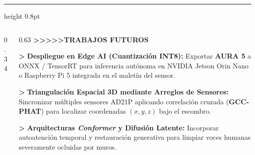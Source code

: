 \documentclass[aspectratio=169, 10pt]{beamer}
\begin{document}
\begin{frame}[plain]
    \vspace{0.25cm}
    {\color{immuneCyan!50}\hrule height 0.8pt}
    \vspace{0.18cm}

    \begin{columns}[T, onlytextwidth]
        \begin{column}{0.34\textwidth}
            \setlength{\fboxsep}{5pt}%
            \setlength{\fboxrule}{1.2pt}%
        \end{column}

        \begin{column}{0.63\textwidth}
            {\bfseries\fontsize{9.2}{10.8}\selectfont\color{immuneCyan}\textgreater\textgreater\textgreater\textgreater\textgreater\color{immuneDarkTeal}TRABAJOS FUTUROS}\\[3pt]
            {\fontsize{7.2}{8.8}\selectfont\color{immuneText}
            \textcolor{immuneCyan}{\bfseries \textgreater} \textbf{Despliegue en Edge AI (Cuantización INT8):} Exportar \textbf{AURA 5} a ONNX / TensorRT para inferencia autónoma en NVIDIA Jetson Orin Nano o Raspberry Pi 5 integrada en el maletín del sensor.\par\vspace{2pt}
            \textcolor{immuneCyan}{\bfseries \textgreater} \textbf{Triangulación Espacial 3D mediante Arreglos de Sensores:} Sincronizar múltiples sensores AD21P aplicando correlación cruzada (\textbf{GCC-PHAT}) para localizar coordenadas $(x, y, z)$ bajo el escombro.\par\vspace{2pt}
            \textcolor{immuneCyan}{\bfseries \textgreater} \textbf{Arquitecturas \textit{Conformer} y Difusión Latente:} Incorporar autoatención temporal y restauración generativa para limpiar voces humanas severamente ocluidas por muros.}
        \end{column}
    \end{columns}
\end{frame}
\end{document}
